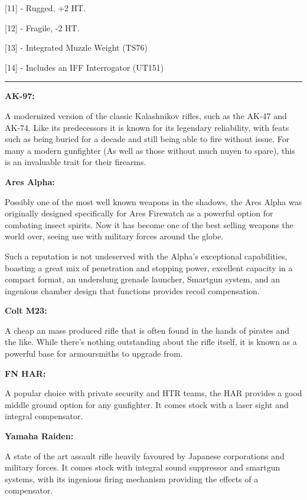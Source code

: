 [11] - Rugged, +2 HT.

[12] - Fragile, -2 HT.

[13] - Integrated Muzzle Weight (TS76)

[14] - Includes an IFF Interrogator (UT151)

\par\rule{\textwidth}{0.5pt} 


\begin{multicols}{2}
\begin{breakbox}
	
	\textbf{AK-97:}
	
	A modernized version of the classic Kalashnikov rifles, such as the AK-47 and AK-74. Like its predecessors it is known for its legendary reliability, with feats such as being buried for a decade and still being able to fire without issue. For many a modern gunfighter (As well as those without much nuyen to spare), this is an invaluable trait for their firearms.
	
	\textbf{Ares Alpha:}
	
	Possibly one of the most well known weapons in the shadows, the Ares Alpha was originally designed specifically for Ares Firewatch as a powerful option for combating insect spirits. Now it has become one of the best selling weapons the world over, seeing use with military forces around the globe. 
	
	Such a reputation is not undeserved with the Alpha's exceptional capabilities, boasting a great mix of penetration and stopping power, excellent capacity in a compact format, an underslung grenade launcher, Smartgun system, and an ingenious chamber design that functions provides recoil compensation.
	
	\textbf{Colt M23:}
	
	A cheap an mass produced rifle that is often found in the hands of pirates and the like. While there's nothing outstanding about the rifle itself, it is known as a powerful base for armoursmiths to upgrade from.
	
	\textbf{FN HAR:}
	
	A popular choice with private security and HTR teams, the HAR provides a good middle ground option for any gunfighter. It comes stock with a laser sight and integral compensator.
	
	\textbf{Yamaha Raiden:}
	
	A state of the art assault rifle heavily favoured by Japanese corporations and military forces. It comes stock with integral sound suppressor and smartgun systems, with its ingenious firing mechanism providing the effects of a compensator.  
	

\end{breakbox}
\end{multicols}
